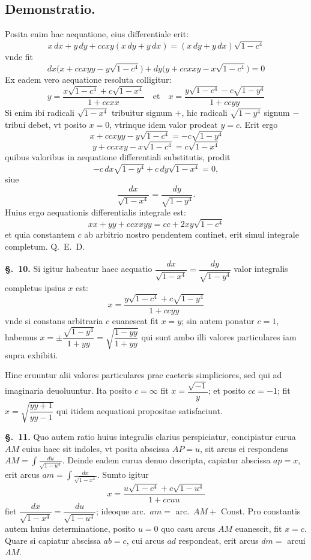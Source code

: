 \documentclass{article}
\begin{document}
\subsection*{Demonstratio.}
Posita enim hac aequatione, eius differentiale erit:
\[ x\,dx + y\,dy + ccxy(x\,dy + y\,dx) = (x\,dy + y\,dx)\sqrt{1-c^{4}} \]
vnde fit
\[ dx\bigl(x + ccxyy - y\sqrt{1-c^{4}}\bigr) + dy\bigl(y + ccxxy - x\sqrt{1-c^{4}}\bigr) = 0 \]
Ex eadem vero aequatione resoluta colligitur:
\[ y = \frac{x\sqrt{1-c^{4}} + c\sqrt{1-x^{4}}}{1+ccxx} \quad\text{et}\quad
   x = \frac{y\sqrt{1-c^{4}} - c\sqrt{1-y^{4}}}{1+ccyy} \]
Si enim ibi radicali $\sqrt{1-x^{4}}$ tribuitur signum $+$, hic radicali $\sqrt{1-y^{4}}$ signum $-$
tribui debet, vt posito $x = 0$, vtrinque idem valor prodeat $y = c$. Erit ergo
\[ x + ccxyy - y\sqrt{1-c^{4}} = -c\sqrt{1-y^{4}} \]
\[ y + ccxxy - x\sqrt{1-c^{4}} = c\sqrt{1-x^{4}} \]
quibus valoribus in aequatione differentiali substitutis, prodit
\[ -c\,dx\sqrt{1-y^{4}} + c\,dy\sqrt{1-x^{4}} = 0, \]
siue
\[ \frac{dx}{\sqrt{1-x^{4}}} = \frac{dy}{\sqrt{1-y^{4}}}. \]
Huius ergo aequationis differentialis integrale est:
\[ xx + yy + ccxxyy = cc + 2xy\sqrt{1-c^{4}} \]
et quia constantem $c$ ab arbitrio nostro pendentem continet, erit simul integrale completum.
Q.~E.~D.

\textbf{§.~10.} Si igitur habeatur haec aequatio
$\dfrac{dx}{\sqrt{1-x^{4}}} = \dfrac{dy}{\sqrt{1-y^{4}}}$ valor integralis completus ipsius $x$ est:
\[ x = \frac{y\sqrt{1-c^{4}} + c\sqrt{1-y^{4}}}{1+ccyy} \]
vnde si constans arbitraria $c$ euanescat fit $x = y$; sin autem ponatur $c = 1$, habemus
$x = \pm\dfrac{\sqrt{1-y^{4}}}{1+yy} = \sqrt{\dfrac{1-yy}{1+yy}}$ qui sunt ambo illi valores
particulares iam supra exhibiti.

Hinc eruuntur alii valores particulares prae caeteris simpliciores, sed qui ad imaginaria
deuoluuntur. Ita posito $c = \infty$ fit $x = \dfrac{\sqrt{-1}}{y}$; et posito $cc = -1$; fit
$x = \sqrt{\dfrac{yy+1}{yy-1}}$ qui itidem aequationi propositae satisfaciunt.

\textbf{§.~11.} Quo autem ratio huius integralis clarius perspiciatur, concipiatur curua $AM$
cuius haec sit indoles, vt posita abscissa $AP = u$, sit arcus ei respondens
$AM = \displaystyle\int \frac{du}{\sqrt{1-u^{4}}}$.
Deinde eadem curua denuo descripta, capiatur abscissa
$ap = x$, erit arcus $am = \displaystyle\int \frac{dx}{\sqrt{1-x^{4}}}$. Sumto igitur
\[ x = \frac{u\sqrt{1-c^{4}} + c\sqrt{1-u^{4}}}{1+ccuu} \]
fiet $\dfrac{dx}{\sqrt{1-x^{4}}} = \dfrac{du}{\sqrt{1-u^{4}}}$; ideoque arc.~$am = $ arc.~$AM + $
Const. Pro constantis autem huius determinatione, posito $u = 0$ quo casu arcus $AM$ euanescit, fit
$x = c$. Quare si capiatur abscissa $ab = c$, cui arcus $ad$ respondeat, erit arcus $dm = $ arcui
$AM$.
\end{document}
